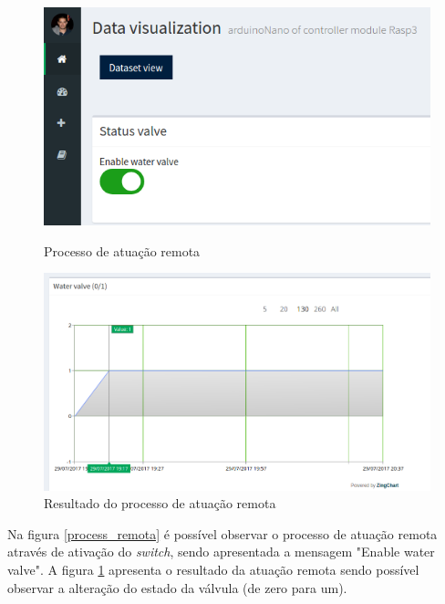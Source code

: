 \begin{figure}[h]
	\centering
	\begin{minipage}[b]{0.495\textwidth}
		\centering
		\includegraphics[width=\textwidth]{prints-web/onstatus.png}
		\caption[Processo de atuação remota]{Processo de atuação remota \newline}
		\label{process_remota}
	\end{minipage}
	\hfill
	\begin{minipage}[b]{0.495\textwidth}
		\centering
		\includegraphics[width=\textwidth]{prints-web/viewstatus.png}
		\caption{Resultado do processo de atuação remota}
		\label{resutl_remota}
	\end{minipage}
\end{figure}


Na figura \ref{process_remota} é possível observar o processo de atuação remota através de ativação do \textit{switch}, sendo apresentada a mensagem "Enable water valve". A figura \ref{resutl_remota} apresenta o resultado da atuação remota sendo possível observar a alteração do estado da válvula (de zero para um).  

